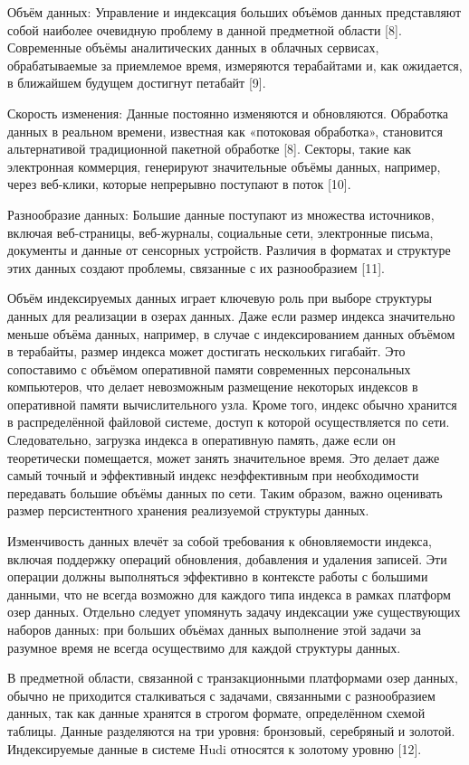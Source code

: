 Объём данных: Управление и индексация больших объёмов данных представляют собой наиболее очевидную проблему в данной предметной области [8]. Современные объёмы аналитических данных в облачных сервисах, обрабатываемые за приемлемое время, измеряются терабайтами и, как ожидается, в ближайшем будущем достигнут петабайт [9].

Скорость изменения: Данные постоянно изменяются и обновляются. Обработка данных в реальном времени, известная как «потоковая обработка», становится альтернативой традиционной пакетной обработке [8]. Секторы, такие как электронная коммерция, генерируют значительные объёмы данных, например, через веб-клики, которые непрерывно поступают в поток [10].

Разнообразие данных: Большие данные поступают из множества источников, включая веб-страницы, веб-журналы, социальные сети, электронные письма, документы и данные от сенсорных устройств. Различия в форматах и структуре этих данных создают проблемы, связанные с их разнообразием [11].

Объём индексируемых данных играет ключевую роль при выборе структуры данных для реализации в озерах данных. Даже если размер индекса значительно меньше объёма данных, например, в случае с индексированием данных объёмом в терабайты, размер индекса может достигать нескольких гигабайт. Это сопоставимо с объёмом оперативной памяти современных персональных компьютеров, что делает невозможным размещение некоторых индексов в оперативной памяти вычислительного узла. Кроме того, индекс обычно хранится в распределённой файловой системе, доступ к которой осуществляется по сети. Следовательно, загрузка индекса в оперативную память, даже если он теоретически помещается, может занять значительное время. Это делает даже самый точный и эффективный индекс неэффективным при необходимости передавать большие объёмы данных по сети. Таким образом, важно оценивать размер персистентного хранения реализуемой структуры данных.

Изменчивость данных влечёт за собой требования к обновляемости индекса, включая поддержку операций обновления, добавления и удаления записей. Эти операции должны выполняться эффективно в контексте работы с большими данными, что не всегда возможно для каждого типа индекса в рамках платформ озер данных. Отдельно следует упомянуть задачу индексации уже существующих наборов данных: при больших объёмах данных выполнение этой задачи за разумное время не всегда осуществимо для каждой структуры данных.

В предметной области, связанной с транзакционными платформами озер данных, обычно не приходится сталкиваться с задачами, связанными с разнообразием данных, так как данные хранятся в строгом формате, определённом схемой таблицы. Данные разделяются на три уровня: бронзовый, серебряный и золотой. Индексируемые данные в системе Hudi относятся к золотому уровню [12].

